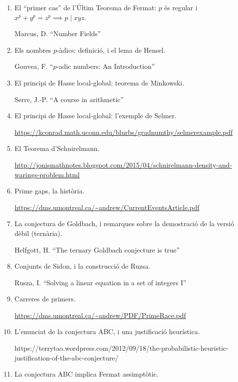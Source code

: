 \begin{enumerate}
\item El ``primer cas'' de l'Últim Teorema de Fermat: $p$ és regular i $x^p+y^p=z^p\implies p\mid xyz$.

  {\tiny Marcus, D. ``Number Fields''}

\item Els nombres $p$-àdics: definició, i el lema de Hensel.

  {\tiny Gouvea, F. ``$p$-adic numbers: An Introduction''}

\item El principi de Hasse local-global: teorema de Minkowski.

  {\tiny Serre, J.-P. ``A course in arithmetic''}

  \item El principi de Hasse local-global: l'exemple de Selmer.

    {\tiny \url{https://kconrad.math.uconn.edu/blurbs/gradnumthy/selmerexample.pdf}}

  \item El Teorema d'Schnirelmann.

    {\tiny \url{http://jonismathnotes.blogspot.com/2015/04/schnirelmann-density-and-warings-problem.html}}
    
  \item Prime gaps, la història.

    {\tiny \url{https://dms.umontreal.ca/~andrew/CurrentEventsArticle.pdf}}
    
  \item La conjectura de Goldbach, i remarques sobre la demostració de la versió dèbil (ternària).

    {\tiny Helfgott, H. ``The ternary Goldbach conjecture is true''}
    
  \item Conjunts de Sidon, i la construcció de Ruzsa.

    {\tiny Rusza, I. ``Solving a linear equation in a set of integers I''}

\item Carreres de primers.

{\tiny \url{https://dms.umontreal.ca/~andrew/PDF/PrimeRace.pdf}}

\item L'enunciat de la conjectura ABC, i una justificació heurística.

{\tiny https://terrytao.wordpress.com/2012/09/18/the-probabilistic-heuristic-justification-of-the-abc-conjecture/}

\item La conjectura ABC implica Fermat assimptòtic.


\end{enumerate}
